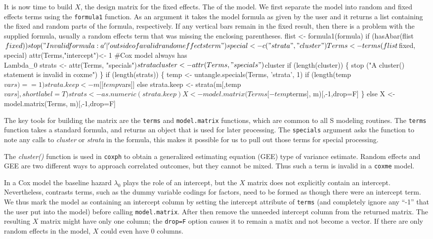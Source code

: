 \documentclass{article}
\begin{document}
It is now time to build $X$, the design matrix for the fixed effects.
The
of the model. 
We first separate the model into random and fixed effects terms
using the {\tt{}formula1} function.
As an argument it takes the model formula as given by the user
and it returns a list containing the fixed and random parts of
the formula, respectively.
If any vertical bars remain in the fixed result, then there is
a problem with the supplied formula, 
usually a random effects term that was missing the enclosing
parentheses.
\nwenddocs{}\endmoddef
    flist <- formula1(formula)
    if (hasAbar(flist$fixed))
        stop("Invalid formula: a '|' outside of a valid random effects term")

    special <- c("strata", "cluster")
    Terms <- terms(flist$fixed, special)
    attr(Terms,"intercept")<- 1  #Cox model always has \\Lambda_0
    strats <- attr(Terms, "specials")$strata
    cluster<- attr(Terms, "specials")$cluster
    if (length(cluster)) \{
        stop ("A cluster() statement is invalid in coxme")
        \}
    if (length(strats)) \{
        temp <- untangle.specials(Terms, 'strata', 1)
        if (length(temp$vars)==1) strata.keep <- m[[temp$vars]]
        else strata.keep <- strata(m[,temp$vars], shortlabel=T)
        strats <- as.numeric(strata.keep)
        X <- model.matrix(Terms[-temp$terms], m)[,-1,drop=F]
        \}
    else X <- model.matrix(Terms, m)[,-1,drop=F]


\nwendcode{}\nwdocspar
The key tools for building the matrix are the {\tt{}terms} and {\tt{}model.matrix}
functions, which are common to all S modeling routines.
The {\tt{}terms} function takes a standard formula, and returns an object that
is used for later processing.
The {\tt{}specials} argument asks the function to note any calls to
\emph{cluster} or \emph{strata} in the formula, this makes it possible
for us to pull out those terms for special processing.

The \emph{cluster()} function is used in {\tt{}coxph} to
obtain a generalized estimating equation (GEE) type of variance estimate.
Random effects and GEE are two different ways to approach
correlated outcomes, but they cannot be mixed.  
Thus such a term is invalid in a {\tt{}coxme} model.

In a Cox model the baseline hazard $\lambda_0$ plays the role of an
intercept, but the $X$ matrix does not explicitly contain an intercept.
Nevertheless, contrasts terms, such as the dummy variable codings for
factors, need to be formed as though there were an intercept term.
We thus mark the model as containing an intercept column by setting the
intercept attribute of {\tt{}terms} (and completely ignore any ``-1'' that
the user put into the model) before calling {\tt{}model.matrix}.
After then remove the unneeded intercept column from the returned
matrix.  
The resulting $X$ matrix might have only one column; the {\tt{}drop=F}
option causes it to remain a matix and not become a vector.
If there are only random effects in the model, $X$ could even have 0
columns.
\end{document}
